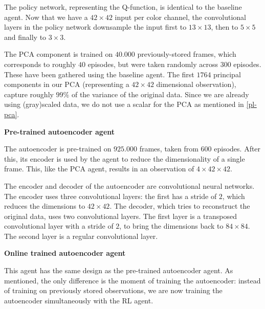 The policy network, representing the Q-function, is identical to the baseline agent. Now that we have a $42 \times 42$ input per color channel, the convolutional layers in the policy network downsample the input first to $13 \times 13$, then to $5 \times 5$ and finally to $3 \times 3$.

The PCA component is trained on $40.000$ previously-stored frames, which corresponds to roughly $40$ episodes, but were taken randomly across $300$ episodes. These have been gathered using the baseline agent. The first $1764$ principal components in our PCA (representing a $42 \times 42$ dimensional observation), capture roughly $99\%$ of the variance of the original data. Since we are already using (gray)scaled data, we do not use a scalar for the PCA  as mentioned in \ref{pl-pca}. \newline\par

\noindent \textbf{Pre-trained autoencoder agent}\par
\noindent The autoencoder is pre-trained on $925.000$ frames, taken from $600$ episodes. After this, its encoder is used by the agent to reduce the dimensionality of a single frame. This, like the PCA agent, results in an observation of $4 \times 42 \times 42$.

The encoder and decoder of the autoencoder are convolutional neural networks. The encoder uses three convolutional layers: the first has a stride of $2$, which reduces the dimensions to $42 \times 42$. The decoder, which tries to reconstruct the original data, uses two convolutional layers. The first layer is a transposed convolutional layer with a stride of $2$, to bring the dimensions back to $84 \times 84$. The second layer is a regular convolutional layer. \newline\par
 
\noindent \textbf{Online trained autoencoder agent}\par
\noindent  This agent has the same design as the pre-trained autoencoder agent. As mentioned, the only difference is the moment of training the autoencoder: instead of training on previously stored observations, we are now training the autoencoder simultaneously with the RL agent.

